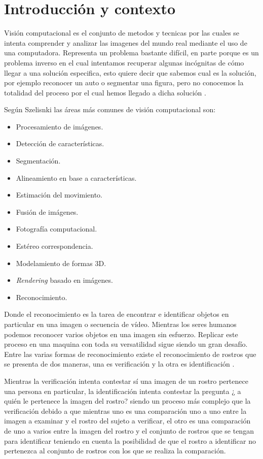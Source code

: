 \chapter{Introducción y contexto}\label{chap:Intro}

Visión computacional es el conjunto de metodos y tecnicas por las cuales se intenta comprender y analizar las imagenes del mundo real mediante el uso de una computadora.
Representa un problema bastante difícil, en parte porque es un problema inverso en el cual intentamos recuperar algunas incógnitas de cómo llegar a una solución especifica, esto quiere decir que sabemos cual es la solución, por ejemplo reconocer un auto o segmentar una figura, pero no conocemos la totalidad del proceso por el cual hemos llegado a dicha solución \cite{szeliski2010computer}. 

Según Szelisnki \cite{szeliski2010computer} las áreas más comunes de visión computacional son: 
\begin{itemize}
\item Procesamiento de imágenes.
\item Detección de características.
\item Segmentación.
\item Alineamiento en base a características.
\item Estimación del movimiento.
\item Fusión de imágenes.
\item Fotografía computacional.
\item Estéreo correspondencia.
\item Modelamiento de formas 3D.
\item \textit{Rendering} basado en imágenes.
\item Reconocimiento.
\end{itemize}

Donde el reconocimiento es la tarea de encontrar e identificar objetos en particular en una imagen o secuencia de vídeo. Mientras los seres humanos podemos reconocer varios objetos en una imagen sin esfuerzo. Replicar este proceso en una maquina con toda su versatilidad sigue siendo un gran desafío.
Entre las varias formas de reconocimiento existe el reconocimiento de rostros que se presenta de dos maneras, una es verificación y la otra es identificación \cite{alice2003biometric}.

Mientras la verificación intenta contestar sí una imagen de un rostro pertenece una persona en particular, la identificación intenta contestar la pregunta ¿ a quién le pertenece la imagen del rostro? siendo un proceso más complejo que la verificación debido a que mientras uno es una comparación uno a uno entre la imagen a examinar y el rostro del sujeto a verificar, el otro es una comparación de uno a varios entre la imagen del rostro y el conjunto de rostros que se tengan para identificar teniendo en cuenta la posibilidad de que el rostro a identificar no pertenezca al conjunto de rostros con los que se realiza la comparación.

